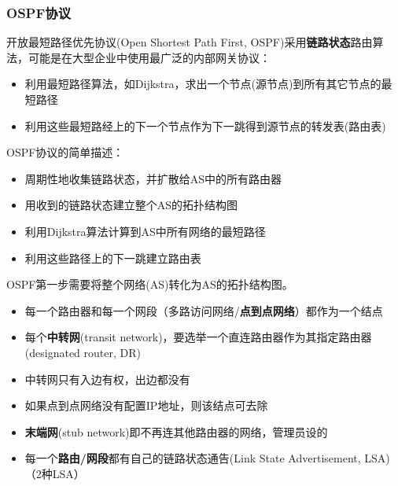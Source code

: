 \subsubsection{OSPF协议}
开放最短路径优先协议(Open Shortest Path First, OSPF)采用\textbf{链路状态}路由算法，可能是在大型企业中使用最广泛的内部网关协议：
\begin{itemize}
	\item 利用最短路径算法，如Dijkstra，求出一个节点(源节点)到所有其它节点的最短路径
	\item 利用这些最短路经上的下一个节点作为下一跳得到源节点的转发表(路由表)
\end{itemize}

OSPF协议的简单描述：
\begin{itemize}
\item 周期性地收集链路状态，并扩散给AS中的所有路由器
\item 用收到的链路状态建立整个AS的拓扑结构图
\item 利用Dijkstra算法计算到AS中所有网络的最短路径
\item 利用这些路径上的下一跳建立路由表
\end{itemize}

OSPF第一步需要将整个网络(AS)转化为AS的拓扑结构图。
\begin{itemize}
	\item 每一个路由器和每一个网段（多路访问网络/\textbf{点到点网络}）都作为一个结点
	\item 每个\textbf{中转网}(transit network)，要选举一个直连路由器作为其指定路由器(designated router, DR)
	\item 中转网只有入边有权，出边都没有
	\item 如果点到点网络没有配置IP地址，则该结点可去除
	\item \textbf{末端网}(stub network)即不再连其他路由器的网络，管理员设的
	\item 每一个\textbf{路由/网段}都有自己的链路状态通告(Link State Advertisement, LSA)（2种LSA）
\end{itemize}

